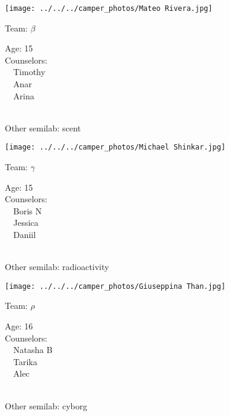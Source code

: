 \documentclass[10pt,letterpaper, landscape]{article}
\begin{document}
\verticalshiftfornextsticker
\renewcommand{\baselinestretch}{1} \begin{sticker}
\noindent\begin{minipage}{0.5\textwidth}\texttt{[image: ../../../camper\_photos/Mateo Rivera.jpg]}\end{minipage}\begin{minipage}{0.45\textwidth}
Team: {\Large $\beta$}

Age:        15\\
Counselors: \\\ \ Timothy\\\ \ Anar\\\ \ Arina\\
\end{minipage} \\ \vspace{0.07in}
Other semilab: scent
\end{sticker}
\horizontalshiftfornextsticker
\renewcommand{\baselinestretch}{1} \begin{sticker}
\noindent\begin{minipage}{0.5\textwidth}\texttt{[image: ../../../camper\_photos/Michael Shinkar.jpg]}\end{minipage}\begin{minipage}{0.45\textwidth}
Team: {\Large $\gamma$}

Age:        15\\
Counselors: \\\ \ Boris N\\\ \ Jessica\\\ \ Daniil\\
\end{minipage} \\ \vspace{0.07in}
Other semilab: radioactivity
\end{sticker}
\horizontalshiftfornextsticker
\renewcommand{\baselinestretch}{1} \begin{sticker}
\noindent\begin{minipage}{0.5\textwidth}\texttt{[image: ../../../camper\_photos/Giuseppina Than.jpg]}\end{minipage}\begin{minipage}{0.45\textwidth}
Team: {\Large $\rho$}

Age:        16\\
Counselors: \\\ \ Natasha B\\\ \ Tarika\\\ \ Alec\\
\end{minipage} \\ \vspace{0.07in}
Other semilab: cyborg
\end{sticker}
\end{document}
